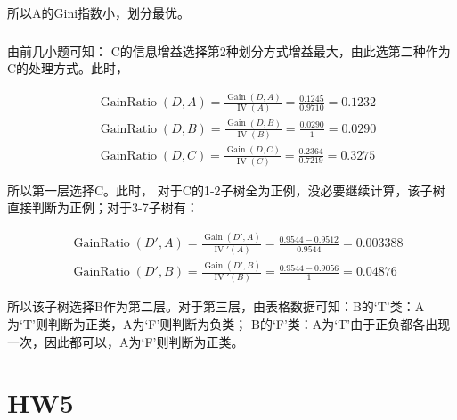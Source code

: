 \documentclass[UTF8,a4paper,AutoFakeBold,AutoFakeSlant]{article}
\begin{document}
所以A的Gini指数小，划分最优。

\subsubsection{}
由前几小题可知：
C的信息增益选择第2种划分方式增益最大，由此选第二种作为C的处理方式。此时，

\begin{equation*}
  \begin{aligned}
     & \operatorname{GainRatio}(D,A) = \frac{\operatorname{Gain}(D,A)}{\operatorname{IV}(A)} = \frac{0.1245}{0.9710} = 0.1232 \\
     & \operatorname{GainRatio}(D,B) = \frac{\operatorname{Gain}(D,B)}{\operatorname{IV}(B)} = \frac{0.0290}{1} = 0.0290      \\
     & \operatorname{GainRatio}(D,C) = \frac{\operatorname{Gain}(D,C)}{\operatorname{IV}(C)} = \frac{0.2364}{0.7219} = 0.3275
  \end{aligned}
\end{equation*}

所以第一层选择C。此时，
对于C的1-2子树全为正例，没必要继续计算，该子树直接判断为正例；对于3-7子树有：

\begin{equation*}
  \begin{aligned}
     & \operatorname{GainRatio}(D',A) = \frac{\operatorname{Gain}(D',A)}{\operatorname{IV}'(A)} = \frac{0.9544-0.9512}{0.9544} = 0.003388 \\
     & \operatorname{GainRatio}(D',B) = \frac{\operatorname{Gain}(D',B)}{\operatorname{IV}'(B)} = \frac{0.9544-0.9056}{1} = 0.04876
  \end{aligned}
\end{equation*}

所以该子树选择B作为第二层。对于第三层，由表格数据可知：B的‘T’类：A为‘T’则判断为正类，A为‘F’则判断为负类；
B的‘F’类：A为‘T’由于正负都各出现一次，因此都可以，A为‘F’则判断为正类。






\section{HW5}
\end{document}
